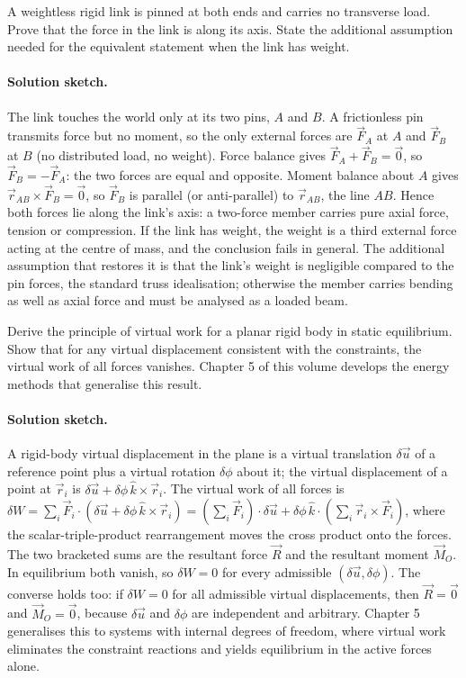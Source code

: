 \begin{exercise}
A weightless rigid link is pinned at both ends and carries no
transverse load. Prove that the force in the link is along its axis.
State the additional assumption needed for the equivalent statement
when the link has weight.
\paragraph{Solution sketch.} The link touches the world only at its two
pins, $A$ and $B$. A frictionless pin transmits force but no moment, so
the only external forces are $\vec{F}_A$ at $A$ and $\vec{F}_B$ at $B$
(no distributed load, no weight). Force balance gives $\vec{F}_A +
\vec{F}_B = \vec{0}$, so $\vec{F}_B = -\vec{F}_A$: the two forces are
equal and opposite. Moment balance about $A$ gives $\vec{r}_{AB} \times
\vec{F}_B = \vec{0}$, so $\vec{F}_B$ is parallel (or anti-parallel) to
$\vec{r}_{AB}$, the line $AB$. Hence both forces lie along the link's
axis: a two-force member carries pure axial force, tension or
compression. If the link has weight, the weight is a third external
force acting at the centre of mass, and the conclusion fails in general.
The additional assumption that restores it is that the link's weight is
negligible compared to the pin forces, the standard truss idealisation;
otherwise the member carries bending as well as axial force and must be
analysed as a loaded beam.
\end{exercise}

\begin{exercise}
Derive the principle of virtual work for a planar rigid body in
static equilibrium. Show that for any virtual displacement
consistent with the constraints, the virtual work of all forces
vanishes. Chapter 5 of this volume develops the energy methods that
generalise this result.
\paragraph{Solution sketch.} A rigid-body virtual displacement in the
plane is a virtual translation $\delta\vec{u}$ of a reference point plus
a virtual rotation $\delta\phi$ about it; the virtual displacement of a
point at $\vec{r}_i$ is $\delta\vec{u} + \delta\phi\,\hat{k} \times
\vec{r}_i$. The virtual work of all forces is $\delta W = \sum_i
\vec{F}_i \cdot (\delta\vec{u} + \delta\phi\,\hat{k} \times \vec{r}_i)
= \left(\sum_i \vec{F}_i\right) \cdot \delta\vec{u} + \delta\phi\,
\hat{k} \cdot \left(\sum_i \vec{r}_i \times \vec{F}_i\right)$, where the
scalar-triple-product rearrangement moves the cross product onto the
forces. The two bracketed sums are the resultant force $\vec{R}$ and the
resultant moment $\vec{M}_O$. In equilibrium both vanish, so $\delta W =
0$ for every admissible $(\delta\vec{u}, \delta\phi)$. The converse
holds too: if $\delta W = 0$ for all admissible virtual displacements,
then $\vec{R} = \vec{0}$ and $\vec{M}_O = \vec{0}$, because
$\delta\vec{u}$ and $\delta\phi$ are independent and arbitrary. Chapter 5
generalises this to systems with internal degrees of freedom, where
virtual work eliminates the constraint reactions and yields equilibrium
in the active forces alone.
\end{exercise}

